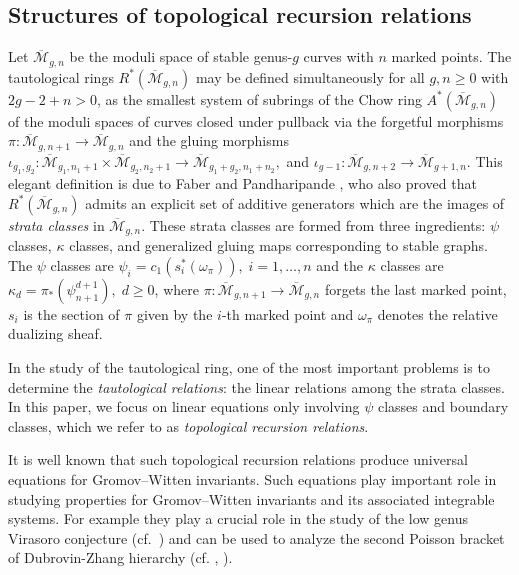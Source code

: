 \documentclass[12pt,reqno]{amsart}
\theoremstyle{plain}
\theoremstyle{definition}
\theoremstyle{remark}
\begin{document}
\subsection{Structures of topological recursion relations}
Let $\overline{\mathcal{M}}_{g,n}$ be the moduli space of stable genus-$g$ curves with $n$ marked points.
The tautological rings  $R^*(\overline{\mathcal{M}}_{g,n})$ may be defined simultaneously for all $g,n\geq0$ with $2g-2+n>0$, as the smallest system of subrings of  the Chow ring $A^*(\overline{\mathcal{M}}_{g,n})$ of the moduli spaces of curves closed under pullback via the forgetful morphisms
$\pi\colon \overline{\mathcal{M}}_{g,n+1} \rightarrow \overline{\mathcal{M}}_{g,n}$ and  the gluing morphisms
$\iota_{g_1,g_2}\colon \overline{\mathcal{M}}_{g_1,n_1+1} \times \overline{\mathcal{M}}_{g_2,n_2+1} \rightarrow \overline{\mathcal{M}}_{g_1+g_2, n_1+n_2},$ and
$\iota_{g-1}\colon \overline{\mathcal{M}}_{g,n+2} \rightarrow \overline{\mathcal{M}}_{g+1,n}$. 
This elegant definition is due to Faber and Pandharipande \cite{faber2005relative}, who also proved that $R^*(\overline{\mathcal{M}}_{g,n})$ admits an explicit set of additive generators which are the images of  {\it strata classes} in $\overline{\mathcal{M}
}_{g,n}$.
These strata classes are formed from three ingredients: $\psi$ classes, $\kappa$ classes, and generalized gluing maps corresponding to
stable graphs. The $\psi$ classes are
$\psi_i=c_1(s_i^*(\omega_{\pi})), \; i=1, \ldots, n$
and the $\kappa$ classes are
$\kappa_d = \pi_*(\psi_{n+1}^{d+1}), \; d \geq 0$, where $\pi\colon \overline{\mathcal{M}}_{g,n+1} \rightarrow \overline{\mathcal{M}}_{g,n}$ forgets the last marked point,  $s_i$ is the section of $\pi$ given by the $i$-th marked point and $\omega_{\pi}$ denotes the relative dualizing sheaf.

In the study of the tautological ring, one of the most important problems is to determine the {\it tautological relations}: the linear relations among the strata classes.
In this paper, we focus on linear equations only involving $\psi$ classes and boundary classes, which we refer to as {\it topological recursion relations}.

It is well known that such topological recursion relations produce universal equations for Gromov--Witten invariants.
Such equations play important role in studying properties for Gromov--Witten invariants and its associated integrable systems.
For example they play a crucial role in the study of the low genus Virasoro conjecture (cf.\ \cite{liu2002quantum}) and  can be used to analyze the second Poisson bracket of
Dubrovin-Zhang hierarchy (cf. \cite{liu2011new}, \cite{iglesias2022bi}).
\end{document}

